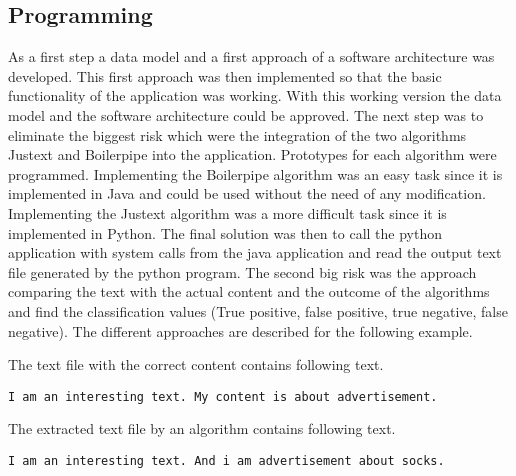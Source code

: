 \subsection{Programming}

As a first step a data model and a first approach of a software architecture was developed. This first approach was then implemented so that the basic functionality of the application was working. With this working version the data model and the software architecture could be approved. 
The next step was to eliminate the biggest risk which were the integration of the two algorithms Justext and Boilerpipe into the application. Prototypes for each algorithm were programmed. Implementing the Boilerpipe algorithm was an easy task since it is implemented in Java and could be used without the need of any modification. Implementing the Justext algorithm was a more difficult task since it is implemented in Python. The final solution was then to call the python application with system calls from the java application and read the output text file generated by the python program. \linebreak
The second big risk was the approach comparing the text with the actual content and the outcome of the algorithms and find the classification values (True positive, false positive, true negative, false negative). The different approaches are described for the following example.


The text file with the correct content contains following text.


\texttt{I am an interesting text. My content is about advertisement.}

The extracted text file by an algorithm contains following text.

\texttt{I am an interesting text. And i am advertisement about socks. }

